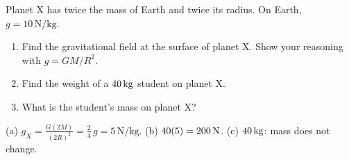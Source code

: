 \begin{exo}{}
Planet X has twice the mass of Earth and twice its radius. On Earth, $g=10\,\mathrm{N/kg}$.
\begin{enumerate}[label=(\alph*)]
\item Find the gravitational field at the surface of planet X. Show your reasoning with $g=GM/R^2$.
\item Find the weight of a $40\,\mathrm{kg}$ student on planet X.
\item What is the student's mass on planet X?
\end{enumerate}
\work{4.5cm}
\begin{solution}
(a) $g_X=\frac{G(2M)}{(2R)^2}=\frac{2}{4}\,g=5\,\mathrm{N/kg}$. \;(b) $40(5)=200\,\mathrm{N}$. \;(c) $40\,\mathrm{kg}$: mass does not change.
\end{solution}
\end{exo}

